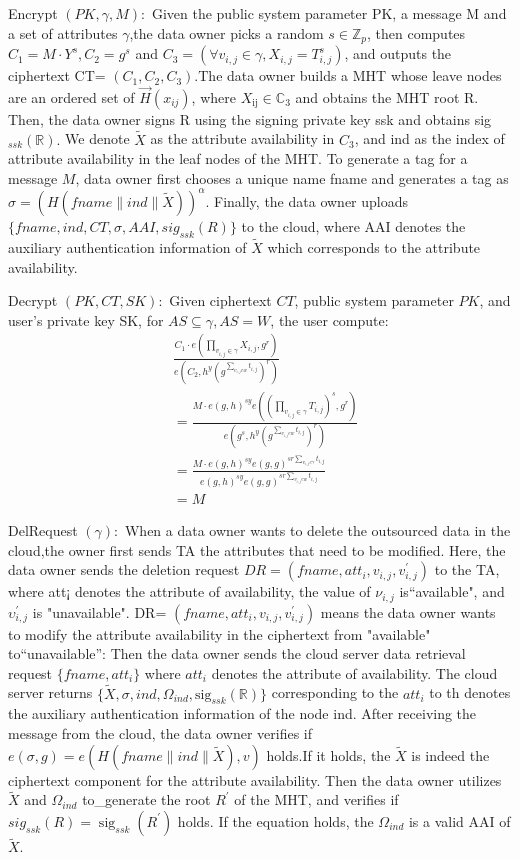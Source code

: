 \documentclass[runningheads]{llncs}
\begin{document}
Encrypt $(PK,\gamma,M){:}$ Given the public system parameter PK, a message M and a set of attributes $\gamma$,the data owner picks a random $s\in\mathbb{Z}_p$, then computes $C_1=M\cdot Y^s,C_2=g^s$ and $C_3=(\forall v_{i,j}\in\gamma,X_{i,j}=T_{i,j}^s)$, and outputs the ciphertext CT= $(C_{1},C_{2},C_{3}).$The data owner builds a MHT whose leave nodes are an ordered set of $\vec{H}(x_{ij})$, where $X_\mathrm{ij}\in\mathbb{C}_3$ and obtains the MHT root R. Then, the data owner signs R using the signing private key ssk and obtains sig$_{ssk}(\mathbb{R}).$ We denote $\tilde{X}$ as the attribute availability in $C_3$, and ind as the index of attribute availability in the leaf nodes of the MHT. To generate a tag for a message $M$, data owner first chooses a unique name fname and generates a tag as $\sigma=(H(fname\parallel ind\parallel\tilde{X}))^\alpha.$ Finally, the data owner uploads $\{fname,ind,CT,\sigma,AAI,sig_{ssk}(R)\}$ to the cloud, where AAI denotes the auxiliary authentication information of $\tilde{X}$ which corresponds to the attribute availability.

Decrypt $(PK,CT,SK){:}$ Given ciphertext $CT$, public system parameter $PK$, and user's private key SK, for $AS\subseteq\gamma,AS=W$, the user compute:
$$\begin{aligned}&\frac{C_{1}\cdot e(\prod_{v_{i,j}\in\gamma}X_{i,j},g^{r})}{e(C_{2},h^{y}(g^{\sum_{v_{i,j}ew}t_{i,j}})^{r})}\\&=\frac{M\cdot e(g,h)^{sy}e((\prod_{v_{i,j}\in\gamma}T_{i,j})^{s},g^{r})}{e(g^{s},h^{y}(g^{\sum_{v_{i,j}ew}t_{i,j}})^{r})}\\&=\frac{M\cdot e(g,h)^{sy}e(g,g)^{sr\sum_{v_{i,j}e\gamma}t_{i,j}}}{e(g,h)^{sy}e(g,g)^{sr\sum_{v_{i,j}ew}t_{i,j}}}\\&=M\end{aligned}$$

DelRequest $(\gamma){:}$ When a data owner wants to delete the outsourced data in the cloud,the owner first sends TA the attributes that need to be modified. Here, the data owner sends the deletion request $DR=(fname,att_i,v_{i,j},v_{i,j}^{\prime})$ to the TA, where att¡ denotes the attribute of availability, the value of $\nu_{i,j}$ is“available", and $\upsilon_{i,j}^{\prime}$ is "unavailable". DR= $(fname,att_{i},v_{i,j},v_{i,j}^{\prime})$ means the data owner wants to modify the attribute availability in the ciphertext from "available" to“unavailable”: Then the data owner sends the cloud server data retrieval request $\{fname,att_i\}$ where $att_i$ denotes the attribute of availability. The cloud server returns $\{ \tilde{X} , \sigma , ind, \Omega _{ind}, \mathrm{sig}_{ssk}( \mathbb{R} ) \}$ corresponding to the $att_i$ to th denotes the auxiliary authentication information of the node ind. After receiving the message from the cloud, the data owner verifies if $e(\sigma,g)=e(H(fname\parallel ind\parallel\widetilde{X}),v)$ holds.If it holds, the $\widetilde{X}$ is indeed the ciphertext component for the attribute availability. Then the data owner utilizes $\widetilde{X}$ and $\Omega_{ind}$ to\_generate the root $R^\prime$ of the MHT, and verifies if $sig_{ssk}(R)=\operatorname{sig}_{ssk}(R^{\prime})$ holds. If the equation holds, the $\Omega_{ind}$ is a valid AAI of $\widetilde{X}.$
\end{document}
